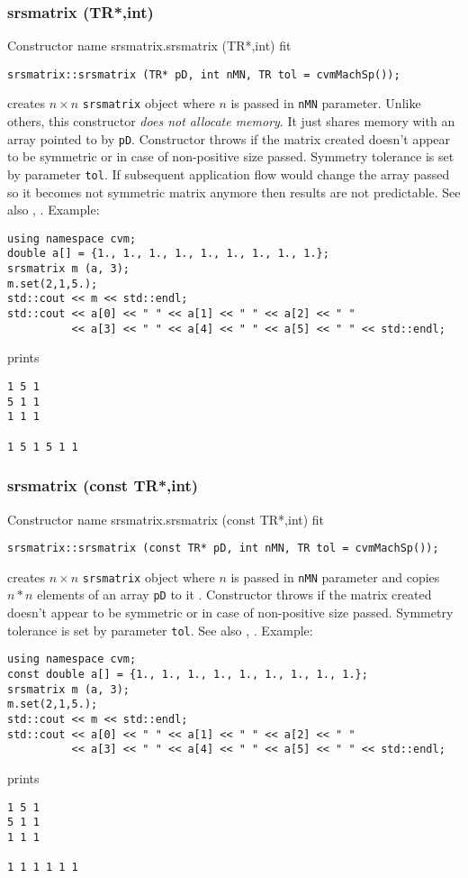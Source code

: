 \subsubsection{srsmatrix (TR*,int)}
Constructor%
\pdfdest name {srsmatrix.srsmatrix (TR*,int)} fit
\begin{verbatim}
srsmatrix::srsmatrix (TR* pD, int nMN, TR tol = cvmMachSp());
\end{verbatim}
creates  $n\times n$ \verb"srsmatrix" object where $n$ is passed in
\verb"nMN" parameter.
Unlike others, this constructor \textit{does not allocate  memory}.
It just shares  memory with an array pointed to by \verb"pD".
Constructor throws  
if the matrix created doesn't appear to be symmetric 
or in case of non-positive size passed. Symmetry tolerance is
set by parameter \verb'tol'.
If subsequent application flow would change the array passed so
it becomes not symmetric matrix anymore then results are not predictable.
See also ,
.
Example:
\begin{Verbatim}
using namespace cvm;
double a[] = {1., 1., 1., 1., 1., 1., 1., 1., 1.};
srsmatrix m (a, 3);
m.set(2,1,5.);
std::cout << m << std::endl;
std::cout << a[0] << " " << a[1] << " " << a[2] << " "
          << a[3] << " " << a[4] << " " << a[5] << " " << std::endl;
\end{Verbatim}
prints
\begin{Verbatim}
1 5 1
5 1 1
1 1 1

1 5 1 5 1 1
\end{Verbatim}
\newpage


\subsubsection{srsmatrix (const TR*,int)}
Constructor%
\pdfdest name {srsmatrix.srsmatrix (const TR*,int)} fit
\begin{verbatim}
srsmatrix::srsmatrix (const TR* pD, int nMN, TR tol = cvmMachSp());
\end{verbatim}
creates  $n\times n$ \verb"srsmatrix" object where $n$ is passed in
\verb"nMN" parameter
and copies $n*n$ elements of an array  \verb"pD" to it .
Constructor throws  
if the matrix created doesn't appear to be symmetric 
or in case of non-positive size passed. Symmetry tolerance is
set by parameter \verb'tol'.
See also ,
.
Example:
\begin{Verbatim}
using namespace cvm;
const double a[] = {1., 1., 1., 1., 1., 1., 1., 1., 1.};
srsmatrix m (a, 3);
m.set(2,1,5.);
std::cout << m << std::endl;
std::cout << a[0] << " " << a[1] << " " << a[2] << " "
          << a[3] << " " << a[4] << " " << a[5] << " " << std::endl;
\end{Verbatim}
prints
\begin{Verbatim}
1 5 1
5 1 1
1 1 1

1 1 1 1 1 1
\end{Verbatim}
\newpage


